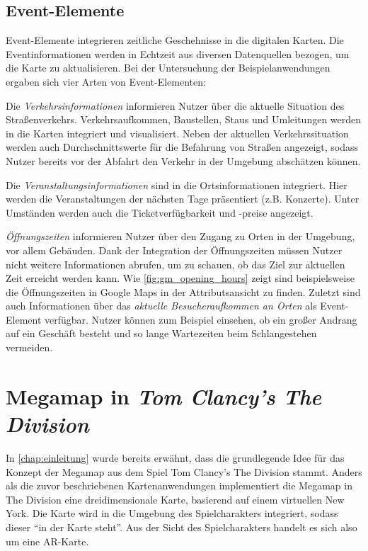\subsection{Event-Elemente}
\label{ssec:event-elements}
Event-Elemente integrieren zeitliche Geschehnisse in die digitalen Karten.
Die Eventinformationen werden in Echtzeit aus diversen Datenquellen bezogen, um die Karte zu aktualisieren.
Bei der Untersuchung der Beispielanwendungen ergaben sich vier Arten von Event-Elementen:

Die \emph{Verkehrsinformationen} informieren Nutzer über die aktuelle Situation des Straßenverkehrs.
Verkehrsaufkommen, Baustellen, Staus und Umleitungen werden in die Karten integriert und visualisiert.
Neben der aktuellen Verkehrssituation werden auch Durchschnittswerte für die Befahrung von Straßen angezeigt, sodass Nutzer bereits vor der Abfahrt den Verkehr in der Umgebung abschätzen können.

Die \emph{Veranstaltungsinformationen} sind in die Ortsinformationen integriert.
Hier werden die Veranstaltungen der nächsten Tage präsentiert (z.B. Konzerte).
Unter Umständen werden auch die Ticketverfügbarkeit und -preise angezeigt.

\emph{Öffnungszeiten} informieren Nutzer über den Zugang zu Orten in der Umgebung, vor allem Gebäuden.
Dank der Integration der Öffnungszeiten müssen Nutzer nicht weitere Informationen abrufen, um zu schauen, ob das Ziel zur aktuellen Zeit erreicht werden kann.
Wie \autoref{fig:gm_opening_hours} zeigt sind beispielsweise die Öffnungszeiten in Google Maps in der Attributsansicht zu finden.
Zuletzt sind auch Informationen über das \emph{aktuelle Besucheraufkommen an Orten} als Event-Element verfügbar.
Nutzer können zum Beispiel einsehen, ob ein großer Andrang auf ein Geschäft besteht und so lange Wartezeiten beim Schlangestehen vermeiden.

\section{Megamap in \emph{Tom Clancy's The Division}}
In \autoref{chap:einleitung} wurde bereits erwähnt, dass die grundlegende Idee für das Konzept der Megamap aus dem Spiel Tom Clancy's The Division stammt.
Anders als die zuvor beschriebenen Kartenanwendungen implementiert die Megamap in The Division eine dreidimensionale Karte, basierend auf einem virtuellen New York.
Die Karte wird in die Umgebung des Spielcharakters integriert, sodass dieser \enquote{in der Karte steht}.
Aus der Sicht des Spielcharakters handelt es sich also um eine AR-Karte.

